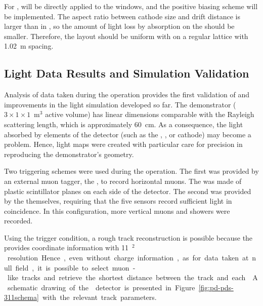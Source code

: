 For   ,  will be directly applied to the  windows, and the positive biasing scheme will be implemented. The aspect ratio between cathode size and drift distance is larger than in , so the amount of light loss by absorption on the  should be smaller. Therefore, the    layout should be uniform with  on a regular lattice with \SI{1.02}{m} spacing. 


\subsection{ Light Data Results and Simulation Validation}

Analysis of data taken during the  operation provides the first validation of and improvements in the light simulation developed so far. 
The demonstrator ($3\times1\times1$~m$^3$ active volume) has linear dimensions comparable with the Rayleigh scattering length, which is approximately \SI{60}{\cm}. 
As a consequence, the light absorbed by elements of the detector (such as the , , or cathode) may become a problem.
Hence, light maps were created with particular care for precision in reproducing the demonstrator's geometry.

Two triggering schemes were used during the  operation.
The first was provided by an external muon tagger, the , to record horizontal muons. The  was made of plastic scintillator planes on each side of the detector.
The second was provided by the  themselves, requiring that the five sensors record sufficient light in coincidence. In this configuration, more vertical muons and showers were recorded.

Using the  trigger condition, a rough track reconstruction is possible because the  provides coordinate information with \SI{11}{\cm$^2$} resolution. Hence, even without charge information, as for data taken at null field, it is possible to select muon-like tracks and retrieve the shortest distance between the track and each . A schematic drawing of the  detector is presented in Figure~\ref{fig:pd-pds-311schema} with the relevant track parameters.

